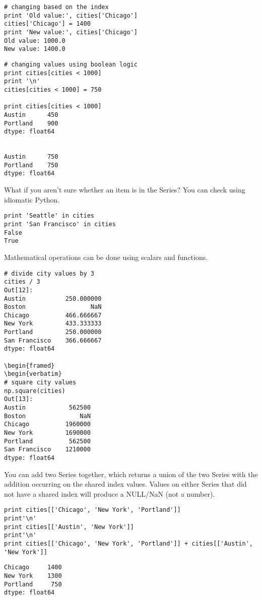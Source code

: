\begin{itemize}
\begin{frame}
\begin{framed}
\begin{verbatim}
# changing based on the index
print 'Old value:', cities['Chicago']
cities['Chicago'] = 1400
print 'New value:', cities['Chicago']
Old value: 1000.0
New value: 1400.0
\end{verbatim}
\end{framed}

\begin{framed}
\begin{verbatim}
# changing values using boolean logic
print cities[cities < 1000]
print '\n'
cities[cities < 1000] = 750

print cities[cities < 1000]
Austin      450
Portland    900
dtype: float64


Austin      750
Portland    750
dtype: float64
\end{verbatim}
\end{framed}
What if you aren't sure whether an item is in the Series? You can check using idiomatic Python.

\begin{framed}
\begin{verbatim}
print 'Seattle' in cities
print 'San Francisco' in cities
False
True
\end{verbatim}
\end{framed}
Mathematical operations can be done using scalars and functions.

\begin{framed}
\begin{verbatim}
# divide city values by 3
cities / 3
Out[12]:
Austin           250.000000
Boston                  NaN
Chicago          466.666667
New York         433.333333
Portland         250.000000
San Francisco    366.666667
dtype: float64

\begin{framed}
\begin{verbatim}
# square city values
np.square(cities)
Out[13]:
Austin            562500
Boston               NaN
Chicago          1960000
New York         1690000
Portland          562500
San Francisco    1210000
dtype: float64
\end{verbatim}
\end{framed}
You can add two Series together, which returns a union of the two Series with the addition occurring on the shared index values. Values on either Series that did not have a shared index will produce a NULL/NaN (not a number).

\begin{framed}
\begin{verbatim}
print cities[['Chicago', 'New York', 'Portland']]
print'\n'
print cities[['Austin', 'New York']]
print'\n'
print cities[['Chicago', 'New York', 'Portland']] + cities[['Austin', 'New York']]
\end{verbatim}
\end{framed}
\begin{verbatim}
Chicago     1400
New York    1300
Portland     750
dtype: float64



\end{verbatim}
\end{frame}
\end{itemize}
